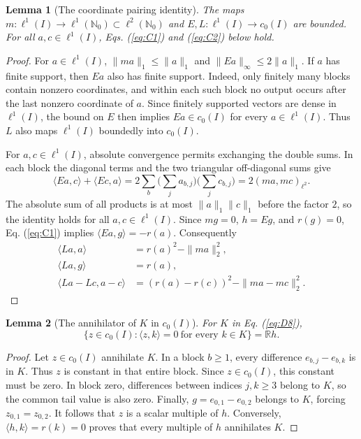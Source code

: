 \documentclass[11pt]{article}
\newcommand{\R}{\mathbb R}
\newcommand{\Nzero}{\mathbb N_0}
\newcommand{\pair}[2]{\langle #1,#2\rangle}
\newtheorem{lemma}{Lemma}
\theoremstyle{definition}
\theoremstyle{remark}
\begin{document}
\begin{lemma}[The coordinate pairing identity]
\label{lem:coordinate-pairing}
The maps $m:\ell^1(I)\to\ell^1(\Nzero)\subset\ell^2(\Nzero)$ and $E,L:\ell^1(I)\to c_0(I)$ are bounded. For all $a,c\in\ell^1(I)$, Eqs. (\ref{eq:C1}) and (\ref{eq:C2}) below hold.
\end{lemma}
\begin{proof}
\label{sec:C1}
For $a\in\ell^1(I)$, $\|ma\|_1\le\|a\|_1$ and $\|Ea\|_\infty\le2\|a\|_1$. If $a$ has finite support, then $Ea$ also has finite support. Indeed, only finitely many blocks contain nonzero coordinates, and within each such block no output occurs after the last nonzero coordinate of $a$. Since finitely supported vectors are dense in $\ell^1(I)$, the bound on $E$ then implies $Ea\in c_0(I)$ for every $a\in\ell^1(I)$. Thus $L$ also maps $\ell^1(I)$ boundedly into $c_0(I)$. 

For $a,c\in\ell^1(I)$, absolute convergence permits exchanging the double sums. In each block the diagonal terms and the two triangular off-diagonal sums give
\begin{equation}
\pair{Ea}{c}+\pair{Ec}{a}
 =2\sum_b\Big(\sum_j a_{b,j}\Big)\Big(\sum_j c_{b,j}\Big)
 =2(ma,mc)_{\ell^2}.
\label{eq:C1}
\end{equation}
The absolute sum of all products is at most $\|a\|_1\|c\|_1$ before the factor $2$, so the identity holds for all $a,c\in\ell^1(I)$. Since $mg=0$, $h=Eg$, and $r(g)=0$, Eq. (\ref{eq:C1}) implies $\pair{Ea}{g}=-r(a)$. Consequently
\begin{equation}
\begin{aligned}
\pair{La}{a}&=r(a)^2-\|ma\|_2^2,\\
\pair{La}{g}&=r(a),\\
\pair{La-Lc}{a-c}&=(r(a)-r(c))^2-\|ma-mc\|_2^2.
\end{aligned}
\label{eq:C2}
\end{equation}
\end{proof}

\begin{lemma}[The annihilator of $K$ in $c_0(I)$]
\label{lem:coordinate-annihilator}
For $K$ in Eq. (\ref{eq:D8}),
\[
\{z\in c_0(I):\pair{z}{k}=0\ \text{for every }k\in K\}=\R h.
\]
\end{lemma}
\begin{proof}
Let $z\in c_0(I)$ annihilate $K$. In a block $b\ge1$, every difference $e_{b,j}-e_{b,k}$ is in $K$. Thus $z$ is constant in that entire block. Since $z\in c_0(I)$, this constant must be zero. In block zero, differences between indices $j,k\ge3$ belong to $K$, so the common tail value is also zero. Finally, $g=e_{0,1}-e_{0,2}$ belongs to $K$, forcing $z_{0,1}=z_{0,2}$. It follows that $z$ is a scalar multiple of $h$. Conversely, $\pair{h}{k}=r(k)=0$ proves that every multiple of $h$ annihilates $K$.
\end{proof}
\end{document}
